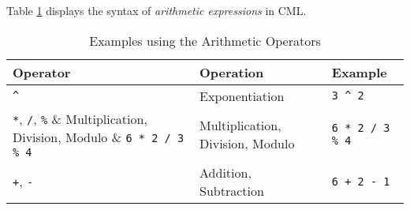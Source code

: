 Table \ref{tab:arithmetic-examples} displays the syntax of \emph{arithmetic expressions}
in CML.

\begin{table}[H]
\centering
\begin{tabular}
{ l l l }
\hline
Operator & Operation & Example \\
\hline
\verb!^! & Exponentiation & \verb!3 ^ 2! \\
\verb!*!, \verb!/!, \verb!%! & Multiplication, Division, Modulo & \verb!6 * 2 / 3 % 4!  \\
\verb!+!, \verb!-! & Addition, Subtraction & \verb!6 + 2 - 1! \\
\end{tabular}
\caption{Examples using the Arithmetic Operators}
\label{tab:arithmetic-examples}
\end{table}
